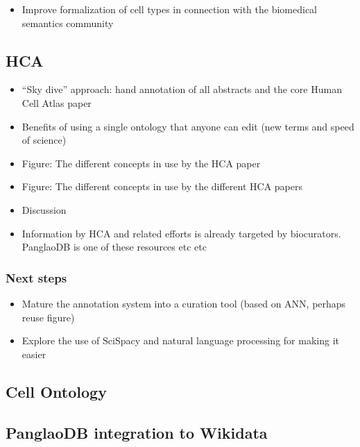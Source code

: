 \begin{itemize}
\tightlist
\item
  Improve formalization of cell types in connection with the biomedical semantics community
\end{itemize}

\hypertarget{hca-1}{%
\subsection{HCA}\label{hca-1}}

\begin{itemize}
\tightlist
\item
  ``Sky dive'' approach: hand annotation of all abstracts and the core Human Cell Atlas paper
\item
  Benefits of using a single ontology that anyone can edit (new terms and speed of science)
\item
  Figure: The different concepts in use by the HCA paper
\item
  Figure: The different concepts in use by the different HCA papers
\item
  Discussion
\item
  Information by HCA and related efforts is already targeted by biocurators. PanglaoDB is one of
  these resources etc etc
\end{itemize}

\hypertarget{next-steps-3}{%
\subsubsection{Next steps}\label{next-steps-3}}

\begin{itemize}
\tightlist
\item
  Mature the annotation system into a curation tool (based on ANN, perhaps reuse figure)
\item
  Explore the use of SciSpacy and natural language processing for making it easier
\end{itemize}

\hypertarget{cell-ontology-1}{%
\subsection{Cell Ontology}\label{cell-ontology-1}}

\hypertarget{panglaodb-integration-to-wikidata-2}{%
\subsection{PanglaoDB integration to Wikidata}\label{panglaodb-integration-to-wikidata-2}}

